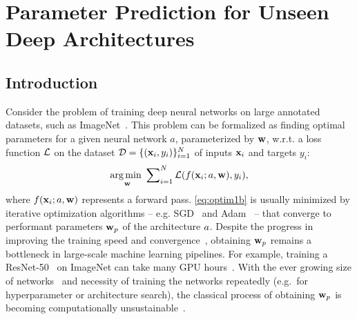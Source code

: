 \graphicspath{{Ch6_2021_neurips/figs/}}

\chapter{{Parameter Prediction for Unseen Deep Architectures}\label{ch:neurips2021}}



\section{Introduction}

Consider the problem of training deep neural networks on large annotated datasets, 
such as ImageNet~\citep{russakovsky2015imagenet}. This problem can be formalized as finding optimal parameters for a given neural network $a$, parameterized by $\mathbf{w}$, w.r.t. a loss function ${\cal L}$ on the dataset $\mathcal{D}=\{(\mathbf{x}_i, y_i)\}_{i=1}^N$ of inputs $\mathbf{x}_i$ and targets $y_i$:
%
\begin{equation}
\label{eq:optim1b}
\underset{\mathbf{w}}{\text{arg\,min }}\sum\nolimits_{i=1}^N {\cal L}(f(\mathbf{x}_i; a, \mathbf{w}), y_i),
\end{equation}
%
where $f(\mathbf{x}_i; a, \mathbf{w})$ represents a forward pass.
\eqref{eq:optim1b} is usually minimized by iterative optimization algorithms -- e.g. SGD~\citep{ruder2016overview} and Adam~\citep{kingma2014adam}
-- that converge to performant parameters $\mathbf{w}_p$ of the architecture $a$. Despite the progress in improving the training speed and convergence~\citep{huang2016deep,brock2017freezeout,choi2019faster,ioffe2015batch}, obtaining $\mathbf{w}_p$ remains a bottleneck in large-scale machine learning pipelines. For example, training a ResNet-50~\citep{he2016deep} on ImageNet can take many GPU hours~\citep{nvidia}. With the ever growing size of networks~\citep{brown2020language} and necessity of training the networks repeatedly (e.g.~for hyperparameter or architecture search), the classical process of obtaining $\mathbf{w}_p$ is becoming computationally unsustainable~\citep{strubell2019energy,cai2019onceforall,thompson2020computational}. 

